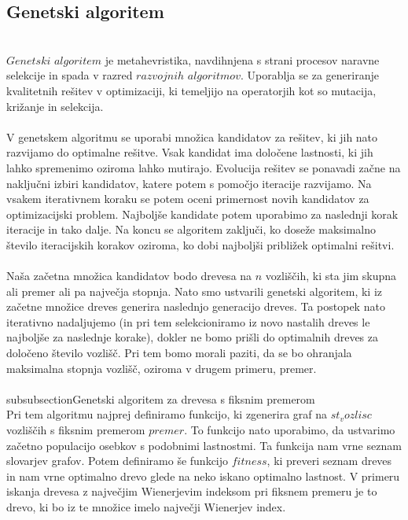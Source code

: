 \documentclass[12pt,a4paper]{amsart}
\theoremstyle{definition} %
\theoremstyle{plain} %
\begin{document}
\subsection{Genetski algoritem}
\
\\
$Genetski$ $algoritem$ je metahevristika, navdihnjena s strani procesov naravne selekcije in spada v razred $razvojnih$
$algoritmov$. Uporablja se za generiranje kvalitetnih rešitev v optimizaciji, ki temeljijo na operatorjih kot so mutacija, križanje
in selekcija.  
\\
\\
V genetskem algoritmu se uporabi množica kandidatov za rešitev, ki jih nato razvijamo do optimalne rešitve. Vsak kandidat
ima določene lastnosti, ki jih lahko spremenimo oziroma lahko mutirajo. Evolucija rešitev se ponavadi začne na naključni izbiri kandidatov,
katere potem s pomočjo iteracije razvijamo. Na vsakem iterativnem koraku se potem oceni primernost novih kandidatov za optimizacijski
problem. Najboljše kandidate potem uporabimo za naslednji korak iteracije in tako dalje. Na koncu se algoritem zaključi,
ko doseže maksimalno število iteracijskih korakov oziroma, ko dobi najboljši približek optimalni rešitvi.
\\
\\
Naša začetna množica kandidatov bodo drevesa na $n$ vozliščih, ki sta jim skupna ali premer ali pa največja stopnja. 
Nato smo ustvarili genetski algoritem, ki iz začetne množice dreves generira naslednjo generacijo dreves. Ta postopek nato iterativno
nadaljujemo (in pri tem selekcioniramo iz novo nastalih dreves le najboljše za naslednje korake), dokler ne bomo prišli do optimalnih 
dreves za določeno število vozlišč. Pri tem bomo morali paziti, da se bo ohranjala maksimalna stopnja vozlišč, 
oziroma v drugem primeru, premer.
\\
\\
subsubsection{Genetski algoritem za drevesa s fiksnim premerom}
\
\\
Pri tem algoritmu najprej definiramo funkcijo, ki zgenerira graf na $st_vozlisc$ vozliščih s fiksnim premerom $premer$. To funkcijo nato uporabimo, da ustvarimo začetno populacijo osebkov s podobnimi lastnostmi. Ta funkcija nam vrne seznam slovarjev grafov. Potem definiramo še funkcijo $fitness$, ki preveri seznam dreves in nam vrne optimalno drevo glede na neko iskano optimalno lastnost. V primeru iskanja drevesa z največjim Wienerjevim indeksom pri fiksnem premeru je to drevo, ki bo iz te množice imelo največji Wienerjev index.
\end{document}
